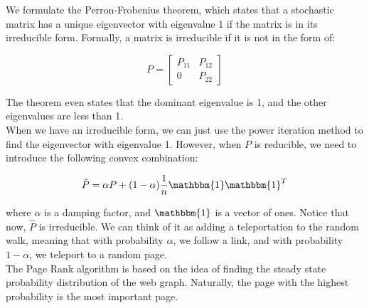 We formulate the Perron-Frobenius theorem, which states that a stochastic matrix has a unique eigenvector
with eigenvalue 1 if the matrix is in its irreducible form. Formally, a matrix is irreducible if it is not
in the form of:

\begin{equation}
    P = \begin{bmatrix}
        P_{11} & P_{12} \\
        0 & P_{22}
    \end{bmatrix}
\end{equation}

The theorem even states that the dominant eigenvalue is 1, and the other eigenvalues are less than 1.\\

When we have an irreducible form, we can just use the power iteration method to find the eigenvector with
eigenvalue 1. However, when $P$ is reducible, we need to introduce the following convex combination:

\begin{equation}
    \hat{P} = \alpha P + (1 - \alpha) \frac{1}{n} \mathbbm{1} \mathbbm{1}^T
\end{equation}

where $\alpha$ is a damping factor, and $\mathbbm{1}$ is a vector of ones. Notice that now, $\hat{P}$ is
irreducible. We can think of it as adding a teleportation to the random walk, meaning that
with probability $\alpha$, we follow a link, and with probability $1 - \alpha$, we teleport to a random page.\\

The Page Rank algorithm is based on the idea of finding the steady state probability distribution of the web graph.
Naturally, the page with the highest probability is the most important page.


